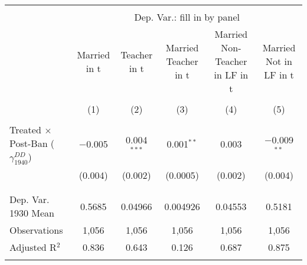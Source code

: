 
\begin{tabular}{@{\extracolsep{5pt}}lccccc} 
\\[-1.8ex]\hline 
\hline \\[-1.8ex] 
 & \multicolumn{5}{c}{Dep. Var.: fill in by panel} \\ 
\cline{2-6} 
 & Married in t & Teacher in t & Married Teacher in t & Married Non-Teacher in LF in t & Married Not in LF in t \\ 
\\[-1.8ex] & (1) & (2) & (3) & (4) & (5)\\ 
\hline \\[-1.8ex] 
 Treated $\times$ Post-Ban ($\gamma_{1940}^{DD}$) & $-$0.005 & 0.004$^{***}$ & 0.001$^{**}$ & 0.003 & $-$0.009$^{**}$ \\ 
  & (0.004) & (0.002) & (0.0005) & (0.002) & (0.004) \\ 
  & & & & & \\ 
\hline \\[-1.8ex] 
Dep. Var. 1930 Mean & 0.5685 & 0.04966 & 0.004926 & 0.04553 & 0.5181 \\ 
Observations & 1,056 & 1,056 & 1,056 & 1,056 & 1,056 \\ 
Adjusted R$^{2}$ & 0.836 & 0.643 & 0.126 & 0.687 & 0.875 \\ 
\hline 
\hline \\[-1.8ex] 
\end{tabular} 
